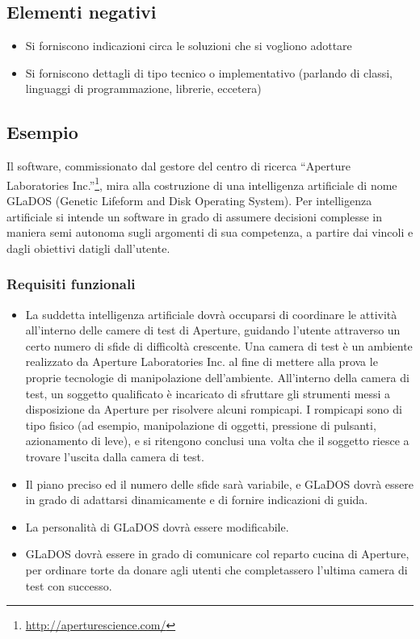 \documentclass[a4paper,12pt]{report}
\begin{document}
\subsection*{Elementi negativi}
\begin{itemize}
	\item Si forniscono indicazioni circa le soluzioni che si vogliono adottare
	\item Si forniscono dettagli di tipo tecnico o implementativo (parlando di classi, linguaggi di programmazione, librerie, eccetera)
\end{itemize}

\subsection*{Esempio}
Il software, commissionato dal gestore del centro di ricerca ``Aperture Laboratories Inc.''\footnote{\url{http://aperturescience.com/}}, mira alla costruzione di una intelligenza artificiale di nome GLaDOS (Genetic Lifeform and Disk Operating System).
%
Per intelligenza artificiale si intende un software in grado di assumere decisioni complesse in maniera semi autonoma sugli argomenti di sua competenza, a partire dai vincoli e dagli obiettivi datigli dall'utente.

\subsubsection{Requisiti funzionali}
\begin{itemize}
	\item La suddetta intelligenza artificiale dovrà occuparsi di coordinare le attività all'interno 
delle camere di test di Aperture, guidando l'utente attraverso un certo numero di sfide di 
difficoltà crescente. Una camera di test è un ambiente realizzato da Aperture Laboratories Inc. al 
fine di mettere alla prova le proprie tecnologie di manipolazione dell'ambiente. All'interno della 
camera di test, un soggetto qualificato è incaricato di sfruttare gli strumenti messi a 
disposizione da Aperture per risolvere alcuni rompicapi. I rompicapi sono di tipo fisico (ad 
esempio, manipolazione di oggetti, pressione di pulsanti, azionamento di leve), e si ritengono 
conclusi una volta che il soggetto riesce a trovare l'uscita dalla camera di test.
	\item Il piano preciso ed il numero delle sfide sarà variabile, e GLaDOS dovrà essere in grado di adattarsi dinamicamente e di fornire indicazioni di guida.
	\item La personalità di GLaDOS dovrà essere modificabile.
	\item GLaDOS dovrà essere in grado di comunicare col reparto cucina di Aperture, per ordinare torte da donare agli utenti che completassero l'ultima camera di test con successo.
\end{itemize}
\end{document}
